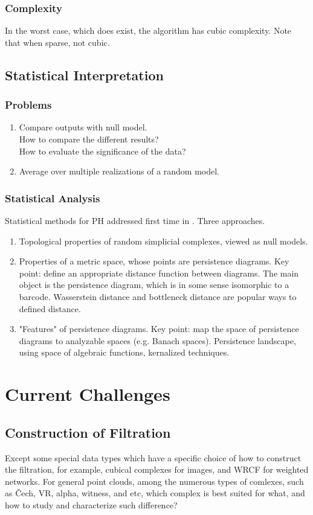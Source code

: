 \documentclass[10pt,a4paper]{article}
\begin{document}
\subsubsection{Complexity}
In the worst case, which does exist, the algorithm has cubic complexity. Note that when sparse, not cubic.

\subsection{Statistical Interpretation}
\subsubsection{Problems}
\begin{enumerate}
	\item Compare outputs with null model.\\
	How to compare the different results?\\
	How to evaluate the significance of the data?
	\item Average over multiple realizations of a random model.
\end{enumerate}
\subsubsection{Statistical Analysis}
Statistical methods for PH addressed first time in \cite{Bubenik2007}. Three approaches.
\begin{enumerate}
	\item Topological properties of random simplicial complexes, viewed as null models.
	\item Properties of a metric space, whose points are persistence diagrams. Key point: define an appropriate distance function between diagrams. The main object is the persistence diagram, which is in some sense isomorphic to a barcode. Wasserstein distance and bottleneck distance are popular ways to defined distance.
	\item "Features" of persistence diagrams. Key point: map the space of persistence diagrams to analyzable spaces (e.g. Banach spaces). Persistence landscape\cite{Bubenik2015}, using space of algebraic functions\cite{Adcock2013}, kernalized techniques.
\end{enumerate}

\section{Current Challenges}
\subsection{Construction of Filtration}
Except some special data types which have a specific choice of how to construct the filtration, for example, cubical complexes for images, and WRCF for weighted networks. For general point clouds, among the numerous types of comlexes, such as \v Cech, VR, alpha, witness, and etc, which complex is best suited for what, and how to study and characterize such difference?
\end{document}
